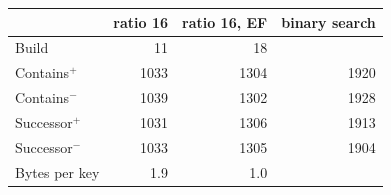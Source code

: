 \begin{tabular}{lrrr}
&\multicolumn{1}{c}{ratio 16}&\multicolumn{1}{c}{ratio 16, EF}&\multicolumn{1}{c}{binary search}\\
\hline
Build & 11 & 18 & \\
Contains$^+$ & 1033 & 1304 & 1920\\
Contains$^-$ & 1039 & 1302 & 1928\\
Successor$^+$ & 1031 & 1306 & 1913\\
Successor$^-$ & 1033 & 1305 & 1904\\
\hline
Bytes per key & 1.9 & 1.0 & \\
\end{tabular}
